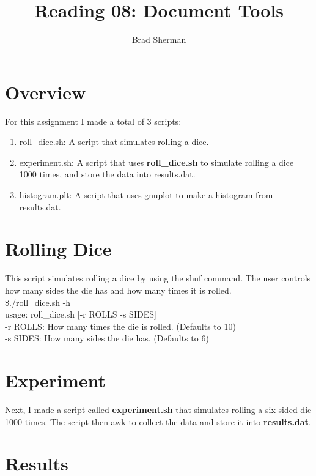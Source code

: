 \documentclass{article}
\title{Reading 08: Document Tools}
\date{}
\author{Brad Sherman}
\begin{document}
\maketitle

\section*{Overview}

For this assignment I made a total of 3 scripts:

\begin{enumerate}

\item{\tt} roll\_dice.sh: A script that simulates rolling a dice.
\item{\tt} experiment.sh: A script that uses {\bf roll\_dice.sh} to simulate rolling a dice 1000 times,	and store the data into results.dat.
\item{\tt} histogram.plt: A script that uses gnuplot to make a histogram from results.dat.

\end{enumerate}

\section*{Rolling Dice}

This script simulates rolling a dice by using the shuf command. The user controls how many sides
the die has and how many times it is rolled.\\
\$./roll\_dice.sh -h\\
usage: roll\_dice.sh [-r ROLLS -s SIDES]\\
-r ROLLS: How many times the die is rolled. (Defaults to 10) \\
-s SIDES: How many sides the die has.       (Defaults to 6)  \\

\section*{Experiment}

Next, I made a script called {\bf experiment.sh} that simulates rolling a six-sided die 1000 times. The script then
awk to collect the data and store it into {\bf results.dat}.

\section*{Results}
\end{document}
